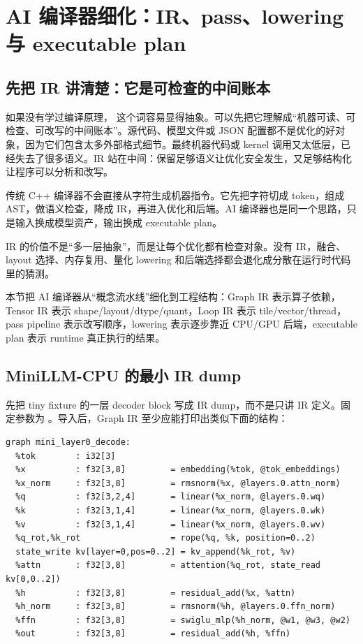 \section{AI 编译器细化：IR、pass、lowering 与 executable plan}

\subsection{先把 IR 讲清楚：它是可检查的中间账本}

如果没有学过编译原理， 这个词容易显得抽象。可以先把它理解成“机器可读、可检查、可改写的中间账本”。源代码、模型文件或 JSON 配置都不是优化的好对象，因为它们包含太多外部格式细节。最终机器代码或 kernel 调用又太低层，已经失去了很多语义。IR 站在中间：保留足够语义让优化安全发生，又足够结构化让程序可以分析和改写。

传统 C++ 编译器不会直接从字符生成机器指令。它先把字符切成 token，组成 AST，做语义检查，降成 IR，再进入优化和后端。AI 编译器也是同一个思路，只是输入换成模型资产，输出换成 executable plan。

\begin{keyidea}
IR 的价值不是“多一层抽象”，而是让每个优化都有检查对象。没有 IR，融合、layout 选择、内存复用、量化 lowering 和后端选择都会退化成分散在运行时代码里的猜测。
\end{keyidea}

本节把 AI 编译器从“概念流水线”细化到工程结构：Graph IR 表示算子依赖，Tensor IR 表示 shape/layout/dtype/quant，Loop IR 表示 tile/vector/thread，pass pipeline 表示改写顺序，lowering 表示逐步靠近 CPU/GPU 后端，executable plan 表示 runtime 真正执行的结果。

\subsection{MiniLLM-CPU 的最小 IR dump}

先把 tiny fixture 的一层 decoder block 写成 IR dump，而不是只讲 IR 定义。固定参数为 。导入后，Graph IR 至少应能打印出类似下面的结构：

\begin{lstlisting}[numbers=none,caption={MiniLLM-CPU 一层 decoder 的 Graph IR dump}]
graph mini_layer0_decode:
  %tok        : i32[3]
  %x          : f32[3,8]         = embedding(%tok, @tok_embeddings)
  %x_norm     : f32[3,8]         = rmsnorm(%x, @layers.0.attn_norm)
  %q          : f32[3,2,4]       = linear(%x_norm, @layers.0.wq)
  %k          : f32[3,1,4]       = linear(%x_norm, @layers.0.wk)
  %v          : f32[3,1,4]       = linear(%x_norm, @layers.0.wv)
  %q_rot,%k_rot                  = rope(%q, %k, position=0..2)
  state_write kv[layer=0,pos=0..2] = kv_append(%k_rot, %v)
  %attn       : f32[3,8]         = attention(%q_rot, state_read kv[0,0..2])
  %h          : f32[3,8]         = residual_add(%x, %attn)
  %h_norm     : f32[3,8]         = rmsnorm(%h, @layers.0.ffn_norm)
  %ffn        : f32[3,8]         = swiglu_mlp(%h_norm, @w1, @w3, @w2)
  %out        : f32[3,8]         = residual_add(%h, %ffn)
\end{lstlisting}

